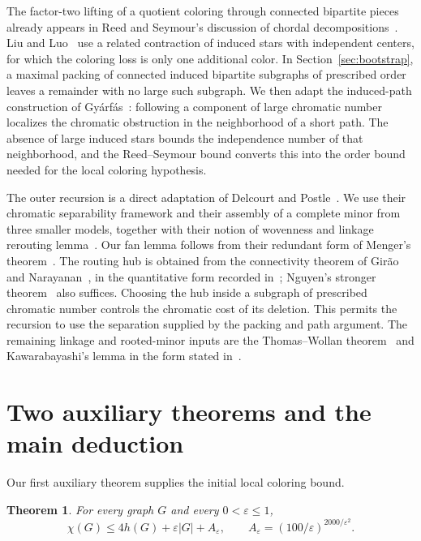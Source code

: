 \documentclass[11pt]{article}
\newtheorem{theorem}{Theorem}
\begin{document}
The factor-two lifting of a quotient coloring through connected
bipartite pieces already appears in Reed and Seymour's discussion of
chordal decompositions~\cite[p.~149]{RS}. Liu and
Luo~\cite[Lemma~3.1]{LL} use a related contraction of induced stars
with independent centers, for which the coloring loss is only one
additional color. In Section~\ref{sec:bootstrap}, a maximal packing
of connected induced bipartite subgraphs of prescribed order leaves
a remainder with no large such subgraph. We then adapt the induced-path
construction of Gy\'arf\'as~\cite[proof of Theorem~2.4]{Gyarfas}:
following a component of large chromatic number localizes the
chromatic obstruction in the neighborhood of a short path. The
absence of large induced stars bounds the independence number of
that neighborhood, and the Reed--Seymour bound converts this into
the order bound needed for the local coloring hypothesis.

The outer recursion is a direct adaptation of Delcourt and
Postle~\cite[Definition~2.4 and Section~7]{DP}. We use their chromatic
separability framework and their assembly of a complete minor from
three smaller models, together with their notion of wovenness and
linkage rerouting lemma~\cite[Definition~5.12 and Lemma~5.15]{DP}.
Our fan lemma follows from their redundant form of Menger's
theorem~\cite[Lemma~5.3]{DP}. The routing hub is obtained from the
connectivity theorem of Gir\~ao and Narayanan~\cite{GN}, in the
quantitative form recorded in~\cite[Theorem~5.1]{DP}; Nguyen's
stronger theorem~\cite[Theorem~1.2]{N} also suffices. Choosing the
hub inside a subgraph of prescribed chromatic number controls the
chromatic cost of its deletion. This permits the recursion to use
the separation supplied by the packing and path argument. The
remaining linkage and rooted-minor inputs are the Thomas--Wollan
theorem~\cite[Corollary~1.3]{TW} and Kawarabayashi's lemma in the
form stated in~\cite[Lemma~5.14]{DP}.

\section{Two auxiliary theorems and the main deduction}\label{sec:deduction}

Our first auxiliary theorem supplies the initial local coloring bound.
\begin{theorem}\label{thm:quantitative}
For every graph $G$ and every $0<\varepsilon\le1$,
\begin{equation}\label{eq:quantitative}
 \chi(G)\le4h(G)+\varepsilon|G|+A_\varepsilon,
 \qquad A_\varepsilon=(100/\varepsilon)^{2000/\varepsilon^2}.
\end{equation}
\end{theorem}
\end{document}

